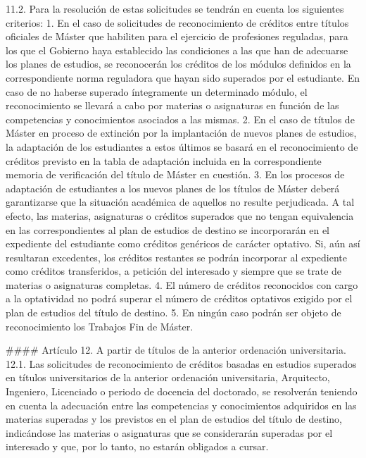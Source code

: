 \documentclass{article}
\begin{document}
\begin{itemize}
\begin{itemize}
\begin{scriptsize}
                  11.2. Para la resolución de estas solicitudes se tendrán en cuenta los siguientes criterios:
                  1. En el caso de solicitudes de reconocimiento de créditos entre títulos oficiales de Máster que habiliten para el ejercicio de profesiones reguladas, para los que el Gobierno haya establecido las condiciones a las que han de adecuarse los planes de estudios, se reconocerán los créditos de los módulos definidos en la correspondiente norma reguladora que hayan sido superados por el estudiante. En caso de no haberse superado íntegramente un determinado módulo, el reconocimiento se llevará a cabo por materias o asignaturas en función de las competencias y conocimientos asociados a las mismas.
                  2. En el caso de títulos de Máster en proceso de extinción por la implantación de nuevos planes de estudios, la adaptación de los estudiantes a estos últimos se basará en el reconocimiento de créditos previsto en la tabla de adaptación incluida en la correspondiente memoria de verificación del título de Máster en cuestión.
                  3. En los procesos de adaptación de estudiantes a los nuevos planes de los títulos de Máster deberá garantizarse que la situación académica de aquellos no resulte perjudicada. A tal efecto, las materias, asignaturas o créditos superados que no tengan equivalencia en las correspondientes al plan de estudios de destino se incorporarán en el expediente del estudiante como créditos genéricos de carácter optativo. Si, aún así resultaran excedentes, los créditos restantes se podrán incorporar al expediente como créditos transferidos, a petición del interesado y siempre que se trate de materias o asignaturas completas.
                  4. El número de créditos reconocidos con cargo a la optatividad no podrá superar el número de créditos optativos exigido por el plan de estudios del título de destino.
                  5. En ningún caso podrán ser objeto de reconocimiento los Trabajos Fin de Máster.

                  \#\#\#\# Artículo 12. A partir de títulos de la anterior ordenación universitaria.
                  12.1. Las solicitudes de reconocimiento de créditos basadas en estudios superados en títulos universitarios de la anterior ordenación universitaria, Arquitecto, Ingeniero, Licenciado o periodo de docencia del doctorado, se resolverán teniendo en cuenta la adecuación entre las competencias y conocimientos adquiridos en las materias superadas y los previstos en el plan de estudios del título de destino, indicándose las materias o asignaturas que se considerarán superadas por el interesado y que, por lo tanto, no estarán obligados a cursar.


\end{scriptsize}
\end{itemize}
\end{itemize}
\end{document}
